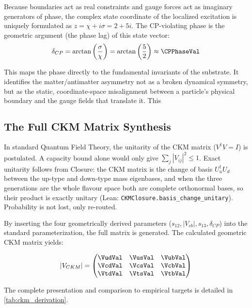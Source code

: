 Because boundaries act as real constraints and gauge forces act as imaginary generators of phase, the complex state coordinate of the localized excitation is uniquely formulated as $z = \chi + i\sigma = 2 + 5i$. The CP-violating phase is the geometric argument (the phase lag) of this state vector:
\begin{equation}
    \delta_{CP} = \arctan\left(\frac{\sigma}{\chi}\right) = \arctan\left(\frac{5}{2}\right) \approx \CPPhaseVal
\end{equation}

This maps the phase directly to the fundamental invariants of the substrate. It identifies the matter/antimatter asymmetry not as a broken dynamical symmetry, but as the static, coordinate-space misalignment between a particle's physical boundary and the gauge fields that translate it. This \CPPhaseAccText

\subsection{The Full CKM Matrix Synthesis}

In standard Quantum Field Theory, the unitarity of the CKM matrix ($V^\dagger V = I$) is postulated. A capacity bound alone would only give $\sum_j|V_{ij}|^2\le1$. Exact unitarity follows from Closure: the CKM matrix is the change of basis $U_u^\dagger U_d$ between the up-type and down-type mass eigenbases, and when the three generations are the whole flavour space both are complete orthonormal bases, so their product is exactly unitary (Lean: \texttt{CKMClosure.basis\_change\_unitary}). Probability is not lost, only re-routed.

By inserting the four geometrically derived parameters ($s_{12}, |V_{cb}|, s_{13}, \delta_{CP}$) into the standard parameterization, the full matrix is generated. The calculated geometric CKM matrix yields:

\begin{equation}
|V_{CKM}| =
\begin{pmatrix}
\VudVal & \VusVal & \VubVal \\
\VcdVal & \VcsVal & \VcbVal \\
\VtdVal & \VtsVal & \VtbVal
\end{pmatrix}
\end{equation}

The complete presentation and comparison to empirical targets is detailed in \cref{tab:ckm_derivation}.



